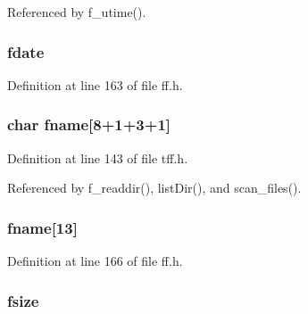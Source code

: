Referenced by f\-\_\-utime().

\hypertarget{struct_f_i_l_i_n_f_o_a73ffadfea4b5bb0cc49c41c4e6203b2b}{
\subsubsection[{fdate}]{ fdate}}\label{struct_f_i_l_i_n_f_o_a73ffadfea4b5bb0cc49c41c4e6203b2b}


Definition at line 163 of file ff.\-h.

\hypertarget{struct_f_i_l_i_n_f_o_a5a78da1cb66644bf00efc71578d7fbba}{
\subsubsection[{fname}]{\setlength{\rightskip}{0pt plus 5cm}char fname\mbox{[}8+1+3+1\mbox{]}}}\label{struct_f_i_l_i_n_f_o_a5a78da1cb66644bf00efc71578d7fbba}


Definition at line 143 of file tff.\-h.



Referenced by f\-\_\-readdir(), list\-Dir(), and scan\-\_\-files().

\hypertarget{struct_f_i_l_i_n_f_o_a7c33845207b44ca3b394052ad6724e72}{
\subsubsection[{fname}]{ fname\mbox{[}13\mbox{]}}}\label{struct_f_i_l_i_n_f_o_a7c33845207b44ca3b394052ad6724e72}


Definition at line 166 of file ff.\-h.

\hypertarget{struct_f_i_l_i_n_f_o_a7582a0b3a658c0543f6cdc7585d84f7c}{
\subsubsection[{fsize}]{ fsize}}\label{struct_f_i_l_i_n_f_o_a7582a0b3a658c0543f6cdc7585d84f7c}


